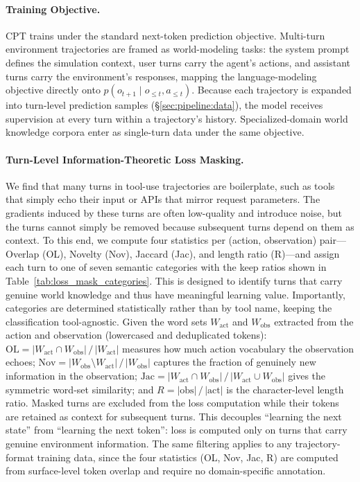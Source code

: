 \documentclass{llmxive}
\begin{document}
\paragraph{Training Objective.}
CPT trains under the standard next-token prediction objective.
Multi-turn environment trajectories are framed as world-modeling tasks: the system prompt defines the simulation context, user turns carry the agent's actions, and assistant turns carry the environment's responses, mapping the language-modeling objective directly onto $p(o_{t+1} \mid o_{\leq t}, a_{\leq t})$.
Because each trajectory is expanded into turn-level prediction samples (\S\ref{sec:pipeline:data}), the model receives supervision at every turn within a trajectory's history.
Specialized-domain world knowledge corpora enter as single-turn data under the same objective.

\paragraph{Turn-Level Information-Theoretic Loss Masking.}
We find that many turns in tool-use trajectories are boilerplate, such as tools that simply echo their input or APIs that mirror request parameters.
The gradients induced by these turns are often low-quality and introduce noise, but the turns cannot simply be removed because subsequent turns depend on them as context.
To this end, we compute four statistics per (action, observation) pair---Overlap (OL), Novelty (Nov), Jaccard (Jac), and length ratio (R)---and assign each turn to one of seven semantic categories with the keep ratios shown in Table~\ref{tab:loss_mask_categories}.
This is designed to identify turns that carry genuine world knowledge and thus have meaningful learning value.
Importantly, categories are determined statistically rather than by tool name, keeping the classification tool-agnostic.
Given the word sets $W_{\text{act}}$ and $W_{\text{obs}}$ extracted from the action and observation (lowercased and deduplicated tokens):
$\text{OL} = |W_{\text{act}} \cap W_{\text{obs}}| \,/\, |W_{\text{act}}|$ measures how much action vocabulary the observation echoes;
$\text{Nov} = |W_{\text{obs}} \setminus W_{\text{act}}| \,/\, |W_{\text{obs}}|$ captures the fraction of genuinely new information in the observation;
$\text{Jac} = |W_{\text{act}} \cap W_{\text{obs}}| \,/\, |W_{\text{act}} \cup W_{\text{obs}}|$ gives the symmetric word-set similarity;
and $R = |\text{obs}| \,/\, |\text{act}|$ is the character-level length ratio.
Masked turns are excluded from the loss computation while their tokens are retained as context for subsequent turns.
This decouples ``learning the next state'' from ``learning the next token'': loss is computed only on turns that carry genuine environment information.
The same filtering applies to any trajectory-format training data, since the four statistics (OL, Nov, Jac, R) are computed from surface-level token overlap and require no domain-specific annotation.
\end{document}

